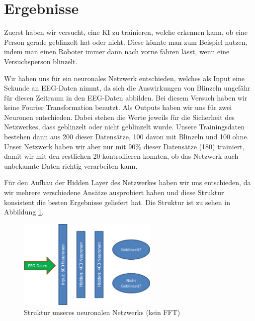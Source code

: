 \documentclass[10pt]{scrartcl}
\begin{document}

	\section{Ergebnisse}

	Zuerst haben wir versucht, eine KI zu trainieren, welche erkennen kann, ob eine Person gerade geblinzelt hat oder nicht. Diese könnte man zum Beispiel nutzen, indem man einen Roboter immer dann nach vorne fahren lässt, wenn eine Versuchsperson blinzelt.

	Wir haben uns für ein neuronales Netzwerk entschieden, welches als Input eine Sekunde an EEG-Daten nimmt, da sich die Auswirkungen von Blinzeln ungefähr für diesen Zeitraum in den EEG-Daten abbilden. Bei diesem Versuch haben wir keine Fourier Transformation benutzt. Als Outputs haben wir uns für zwei Neuronen entschieden. Dabei stehen die Werte jeweils für die Sicherheit des Netzwerkes, dass geblinzelt oder nicht geblinzelt wurde.
	Unsere Trainingsdaten bestehen dann aus 200 dieser Datensätze, 100 davon mit Blinzeln und 100 ohne. Unser Netzwerk haben wir aber nur mit 90\% dieser Datensätze (180) trainiert, damit wir mit den restlichen 20 kontrollieren konnten, ob das Netzwerk auch unbekannte Daten richtig verarbeiten kann.

	Für den Aufbau der Hidden Layer des Netzwerkes haben wir uns entschieden, da wir mehrere verschiedene Ansätze ausprobiert haben und diese Struktur konsistent die besten Ergebnisse geliefert hat. Die Struktur ist zu sehen in Abbildung \ref{NetzStruktur}.

	\begin{figure}[H]
		\centering
		\includegraphics[width=0.6\textwidth]{pictures/netzwerk-struktur.png}
		\caption{Struktur unseres neuronalen Netzwerks (kein FFT)}
		\label{NetzStruktur}
	\end{figure}
\end{document}
